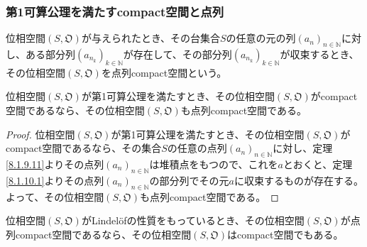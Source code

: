 \documentclass[dvipdfmx]{jsarticle}
\begin{document}
\subsubsection{第1可算公理を満たすcompact空間と点列}%
\begin{dfn}
位相空間$\left( S,\mathfrak{O} \right)$が与えられたとき、その台集合$S$の任意の元の列$\left( a_{n} \right)_{n \in \mathbb{N}}$に対し、ある部分列$\left( a_{n_{k}} \right)_{k \in \mathbb{N}}$が存在して、その部分列$\left( a_{n_{k}} \right)_{k \in \mathbb{N}}$が収束するとき、その位相空間$\left( S,\mathfrak{O} \right)$を点列compact空間という。
\end{dfn}
\begin{thm}\label{8.1.10.4}
位相空間$\left( S,\mathfrak{O} \right)$が第1可算公理を満たすとき、その位相空間$\left( S,\mathfrak{O} \right)$がcompact空間であるなら、その位相空間$\left( S,\mathfrak{O} \right)$も点列compact空間である。
\end{thm}
\begin{proof}
位相空間$\left( S,\mathfrak{O} \right)$が第1可算公理を満たすとき、その位相空間$\left( S,\mathfrak{O} \right)$がcompact空間であるなら、その集合$S$の任意の点列$\left( a_{n} \right)_{n \in \mathbb{N}}$に対し、定理\ref{8.1.9.11}よりその点列$\left( a_{n} \right)_{n \in \mathbb{N}}$は堆積点をもつので、これを$a$とおくと、定理\ref{8.1.10.1}よりその点列$\left( a_{n} \right)_{n \in \mathbb{N}}$の部分列でその元$a$に収束するものが存在する。よって、その位相空間$\left( S,\mathfrak{O} \right)$も点列compact空間である。
\end{proof}
\begin{thm}\label{8.1.10.5}
位相空間$\left( S,\mathfrak{O} \right)$がLindelöfの性質をもっているとき、その位相空間$\left( S,\mathfrak{O} \right)$が点列compact空間であるなら、その位相空間$\left( S,\mathfrak{O} \right)$はcompact空間でもある。
\end{thm}
\end{document}
